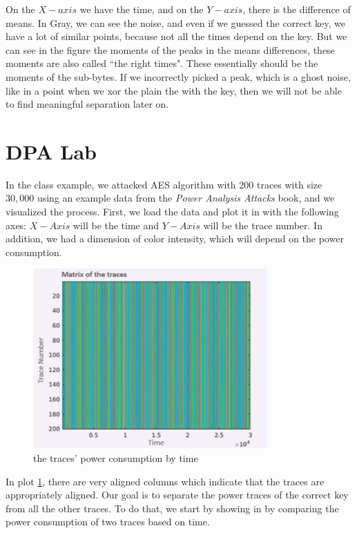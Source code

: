 On the $X-axis$ we have the time, and on the $Y-axis$, there is the difference of means. 
In Gray, we can see the noise, and even if we guessed the correct key, we have a lot of similar points, because not all the times depend on the key. 
But we can see in the figure the moments of the peaks in the means
differences, these moments are also called ``the right times".
These essentially should be the moments of the sub-bytes. 
If we incorrectly picked a peak, which is a ghost noise, like in a point when we xor the plain the with the key, then we will not be able to find meaningful separation later on.

\section{DPA Lab}
In the class example, we attacked AES algorithm with 200 traces with size $30,000$ using an example data from the \textit{Power Analysis Attacks} book, and we visualized the process. 
First, we load the data and plot it in  with the following axes: $X-Axis$ will be the time and $Y-Axis$ will be the trace number.
In addition, we had a dimension of color intensity, which will depend on the power consumption.

\begin{figure}[!ht]
    \centering
    \includegraphics[width=0.8\textwidth]{images/Lecture6/traceByTime.png}
    \caption{the traces' power consumption by time} \label{fig:traceByTime}
\end{figure}

In plot \ref{fig:traceByTime}, there are very aligned columns which indicate that the traces are appropriately aligned. 
Our goal is to separate the power traces of the correct key from all the other traces. 
To do that, we start by showing in  by comparing the power consumption of two traces based on time.

